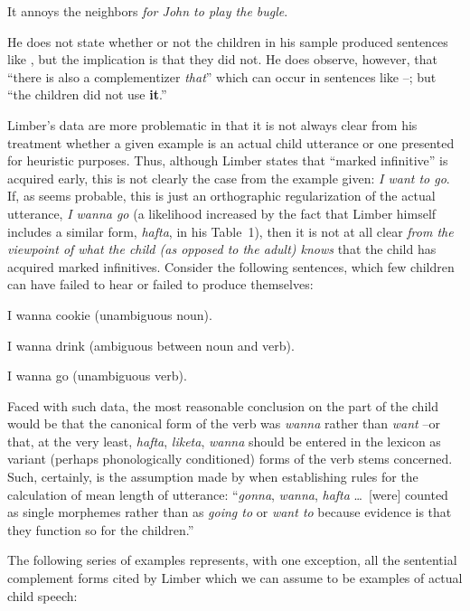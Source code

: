 \ea\label{ex:3:28}
 It annoys the neighbors \textit{for John to play the bugle}.
\z

\noindent He does not state whether or not the children in his sample produced sentences like , but the implication is that they did not. He does observe, however, that ``there is also a complementizer \textit{that}'' which can occur in sentences like --; but ``the children did not use \textbf{it}.''

Limber's data are more problematic in that it is not always clear from his treatment whether a given example is an actual child utterance or one presented for heuristic purposes. Thus, although Limber states that ``marked infinitive'' is acquired early, this is not clearly the case from the example given: \textit{I want to go}. If, as seems probable, this is just an orthographic regularization of the actual utterance, \textit{I wanna go} (a likelihood increased by the fact that Limber himself includes a similar form, \textit{hafta}, in his Table~1), then it is not at all clear \textit{from the viewpoint of what the child (as opposed to the adult) knows} that the child has acquired marked infinitives. Consider the following sentences, which few children can have failed to hear or failed to produce themselves:

\ea\label{ex:3:29}
 I wanna cookie (unambiguous noun).
\z

\ea\label{ex:3:30}
 I wanna drink (ambiguous between noun and verb).
\z

\ea\label{ex:3:31}
 I wanna go (unambiguous verb).
\z

\noindent Faced with such data, the most reasonable conclusion on the part of the child would be that the canonical form of the verb was \textit{wanna} rather than \textit{want} --or that, at the very least, \textit{hafta}, \textit{liketa}, \textit{wanna} should be entered in the lexicon as variant (perhaps phonologically conditioned) forms of the verb stems concerned. Such, certainly, is the assumption made by \citet[54]{Brown1973} when establishing rules for the calculation of mean length of utterance: ``\textit{gonna}, \textit{wanna}, \textit{hafta} \ldots~[were] counted as single morphemes rather than as \textit{going to} or \textit{want to} because evidence is that they function so for the children.''

The following series of examples represents, with one exception, all the sentential complement forms cited by Limber which we can assume to be examples of actual child speech:

